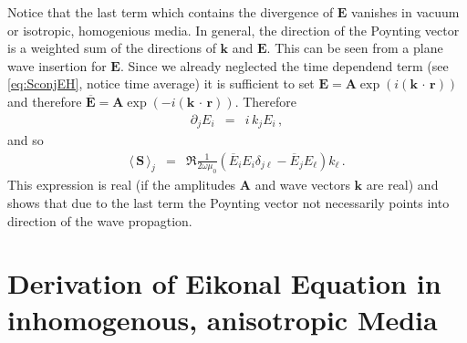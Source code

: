 \documentclass[12pt,a4paper,twoside,openright,BCOR10mm,headsepline,titlepage,abstracton,chapterprefix,final]{scrreprt}
\newcommand\Vector[1]{{\mathbf{#1}}}
\newcommand\vacuum{0}
\newcommand\Location{\Vector{r}}
\newcommand\wavenumber{k}
\newcommand\Wavevector{\Vector{\wavenumber}}
\newcommand{\scpm}[2]{(#1\,\cdot\,#2)}
\newcommand\scalarEfield{E}
\newcommand\Efield{\Vector{\scalarEfield}}
\newcommand\vacuumpermeability{\mu_{\vacuum}}
\newcommand{\timeavg}[1]{{\langle\,#1\,\rangle}}
\begin{document}
Notice that the last term which contains the divergence of $\Efield$ vanishes in vacuum or isotropic, homogenious media.
In general, the direction of the Poynting vector is a weighted sum of the directions of $\Wavevector$ and $\Efield$. This can be seen from
a plane wave insertion for $\Efield$. Since we already neglected the time dependend term (see \eqref{eq:SconjEH}, notice time average) it is sufficient to
set $\Efield = \Vector{A} \exp(i \scpm{\Vector{k}}{\Location})$ and therefore $\overline{\Efield} = \Vector{A} \exp(-i \scpm{\Vector{k}}{\Location})$.
Therefore
\begin{eqnarray}
  \partial_j E_i &=& i\,k_j E_i\,,
\end{eqnarray}
and so
\begin{eqnarray}
 \timeavg{\Vector{S}}_j &=&  
    \Re\frac{1}{2 \omega \vacuumpermeability}( 
	\overline{\scalarEfield}_i \scalarEfield_i \delta_{j\ell}  
	- \overline{\scalarEfield}_j \scalarEfield_\ell 
      ) k_\ell\,.\label{eq:poyntingvector}
\end{eqnarray}
This expression is real (if the amplitudes $\Vector{A}$ and wave vectors $\Vector{k}$ are real) and shows that due to the last term the Poynting vector not necessarily points into direction of the wave propagtion.


\section{Derivation of Eikonal Equation in inhomogenous, anisotropic Media}
{\color{red}{This section needs heavy checking as I am not sure about some steps!}}
\end{document}

